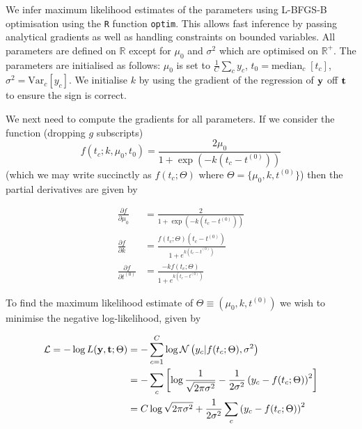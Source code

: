 We infer maximum likelihood estimates of the parameters using L-BFGS-B optimisation \cite{byrd1995limited} using the \texttt{R} function \texttt{optim}. This allows fast inference by passing analytical gradients as well as handling constraints on bounded variables. All parameters are defined on $\mathbb{R}$ except for $\mu_0$ and $\sigma^2$ which are optimised on $\mathbb{R}^+$. The parameters are initialised as follows: $\mu_0$ is set to $\frac{1}{C} \sum_c y_c$, $t_0 = \text{median}_c \;[ t_c]$, $\sigma^2 = \text{Var}_c [y_c]$. We initialise $k$ by using the gradient of the regression of ${\bf y}$ off ${\bf t}$ to ensure the sign is correct.

We next need to compute the gradients for all parameters. If we consider the function (dropping $g$ subscripts)
\begin{equation}
	f(t_c; k, \mu_0, t_0) = \frac{2 \mu_0}{1 + \exp\left(-k(t_c - t^{(0)})\right)}
\end{equation}
(which we may write succinctly as $f(t_c; \Theta)$ where $\Theta = \{ \mu_0, k, t^{(0)} \}$) then the partial derivatives are given by

\begin{equation} \label{eq:derivatives}
\begin{aligned}
\frac{\partial f}{\partial \mu_0} & = \frac{2}{1 + \exp\left(-k(t_c - t^{(0)})\right)} \\
\frac{\partial f}{\partial k} & = \frac{ f(t_c; \Theta) (t_c - t^{(0)})}{1 + e^{k(t_c - t^{(0)})}} \\
\frac{\partial f}{\partial t^{(0)}} & = \frac{-k f(t_c; \Theta)}{1 + e^{k(t_c - t^{(0)})}}
\end{aligned}
\end{equation}

To find the maximum likelihood estimate of $\Theta \equiv (\mu_0, k, t^{(0)})$ we wish to minimise the negative log-likelihood, given by

\begin{equation}
\begin{aligned}
\mathcal{L}  = - \log L({\bf y}, {\bf t}; \Theta) & = -\sum_{c=1}^C \log \mathcal{N}\left(y_c | f(t_c; \Theta), \sigma^2 \right) \\
& = -\sum_c \left[ \log \frac{1}{\sqrt{2 \pi \sigma^2}} - \frac{1}{2 \sigma^2} \left( y_c - f(t_c; \Theta) \right)^2\right] \\
& = C \log \sqrt{2 \pi \sigma^2} + \frac{1}{2 \sigma^2} \sum_c \left( y_c - f(t_c; \Theta) \right)^2
\end{aligned}
\end{equation}

